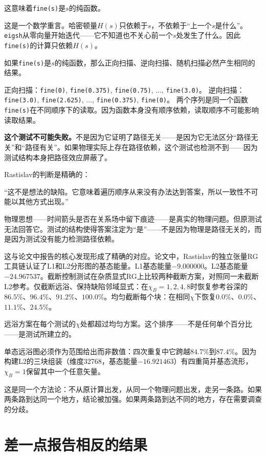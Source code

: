 \documentclass[11pt,a4paper]{book}
\theoremstyle{definition}
\begin{document}
这意味着\texttt{fine(s)}是$s$的纯函数。

这是一个数学重言。哈密顿量$H(s)$只依赖于$s$，不依赖于“上一个$s$是什么”。\texttt{eigsh}从零向量开始迭代——它不知道也不关心前一个$s$处发生了什么。因此\texttt{fine(s)}的计算只依赖$H(s)$。

如果\texttt{fine(s)}是$s$的纯函数，那么正向扫描、逆向扫描、随机扫描必然产生相同的结果。

正向扫描：\texttt{fine(0)}, \texttt{fine(0.375)}, \texttt{fine(0.75)}, ..., \texttt{fine(3.0)}。
逆向扫描：\texttt{fine(3.0)}, \texttt{fine(2.625)}, ..., \texttt{fine(0.375)}, \texttt{fine(0)}。
两个序列是同一个函数\texttt{fine(s)}在不同顺序下的读取。因为函数本身没有顺序依赖，读取顺序不可能影响读取结果。

\textbf{这个测试不可能失败。}不是因为它证明了路径无关——是因为它无法区分“路径无关”和“路径有关”。如果物理实际上存在路径依赖，这个测试也检测不到——因为测试结构本身把路径效应屏蔽了。

Rastislav的判断是精确的：

“这不是想法的缺陷。它意味着遍历顺序从来没有办法达到答案，所以一致性不可能以其他方式出现。”

物理思想——时间箭头是否在关系场中留下痕迹——是真实的物理问题。但原测试无法回答它。测试的结构使得答案注定为“是”——不是因为物理是路径无关的，而是因为测试没有能力检测路径依赖。

这与论文中报告的核心发现形成了精确的对应。论文中，Rastislav的独立张量RG工具链认证了L1和L2分形图的基态能量。L1基态能量$-9.000000$。L2基态能量$-24.967537$。截断控制测试在杂质显式RG上比较两种截断方案，对照同一未截断L2参考。仅截断远浴、保持缺陷邻域显式：在$\chi_B=1,2,4,8$时恢复参考谷深的$86.5\%$、$96.4\%$、$91.2\%$、$100.0\%$。均匀截断每个块：在相同$\chi$下恢复$0.0\%$、$0.0\%$、$11.1\%$、$24.5\%$。

远浴方案在每个测试的$\chi$处都超过均匀方案。这个排序——不是任何单个百分比——是测试所建立的。

单态远浴图必须作为范围给出而非数值：四次重复中它跨越$84.7\%$到$87.4\%$。因为构建L2的三块组装（维度32768，基态能量$-16.921463$）有四重简并基态流形，$\chi_B=1$保留其中一个任意矢量。

这是同一个方法论：不从原计算出发，从同一个物理问题出发，走另一条路。如果两条路到达同一个地方，结论被加强。如果两条路到达不同的地方，存在需要调查的分歧。

\section{差一点报告相反的结果}
\end{document}
